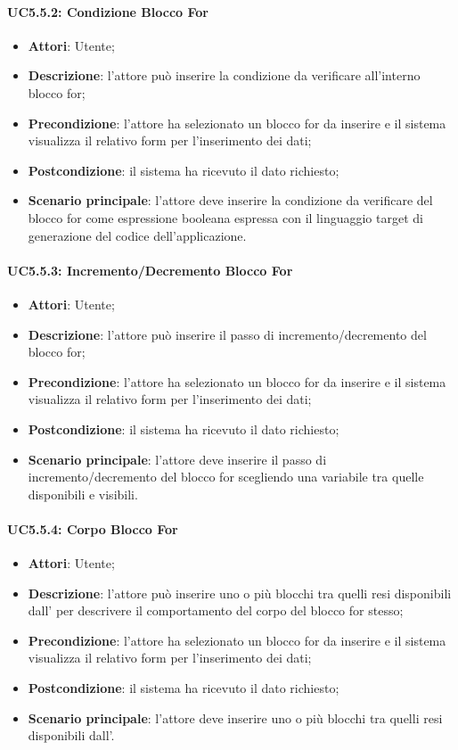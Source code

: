 \paragraph{UC5.5.2: Condizione Blocco For}
\label{UC5.5.2}
\begin{itemize}
	\item \textbf{Attori}: Utente;
	\item \textbf{Descrizione}: l'attore può inserire la condizione da verificare all'interno blocco for;
	\item \textbf{Precondizione}: l'attore ha selezionato un blocco for da inserire e il sistema visualizza il relativo form per l'inserimento dei dati;
	\item \textbf{Postcondizione}: il sistema ha ricevuto il dato richiesto;
	\item \textbf{Scenario principale}: l'attore deve inserire la condizione da verificare del blocco for come espressione booleana espressa con il linguaggio target di generazione del codice dell'applicazione.
\end{itemize}

\paragraph{UC5.5.3: Incremento/Decremento Blocco For}
\label{UC5.5.3}
\begin{itemize}
	\item \textbf{Attori}: Utente;
	\item \textbf{Descrizione}: l'attore può inserire il passo di incremento/decremento del blocco for;
	\item \textbf{Precondizione}: l'attore ha selezionato un blocco for da inserire e il sistema visualizza il relativo form per l'inserimento dei dati;
	\item \textbf{Postcondizione}: il sistema ha ricevuto il dato richiesto;
	\item \textbf{Scenario principale}: l'attore deve inserire il passo di incremento/decremento del blocco for scegliendo una variabile tra quelle disponibili e visibili.
\end{itemize}

\paragraph{UC5.5.4: Corpo Blocco For}
\label{UC5.5.4}
\begin{itemize}
	\item \textbf{Attori}: Utente;
	\item \textbf{Descrizione}: l'attore può inserire uno o più blocchi tra quelli resi disponibili dall' per descrivere il comportamento del corpo del blocco for stesso;
	\item \textbf{Precondizione}: l'attore ha selezionato un blocco for da inserire e il sistema visualizza il relativo form per l'inserimento dei dati;
	\item \textbf{Postcondizione}: il sistema ha ricevuto il dato richiesto;
	\item \textbf{Scenario principale}: l'attore deve inserire uno o più blocchi tra quelli resi disponibili dall'.
\end{itemize}

